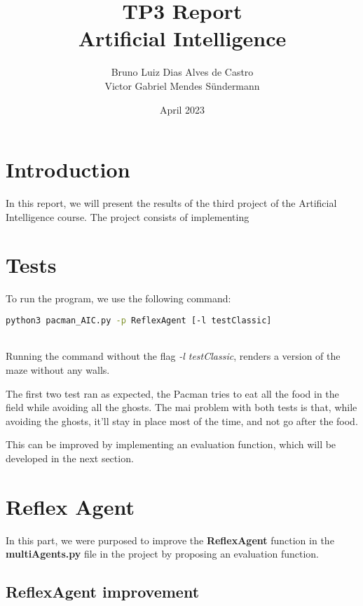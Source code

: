 \documentclass{article}
\title{\huge TP3 Report \\ Artificial Intelligence}
\author{Bruno Luiz Dias Alves de Castro \\ Victor Gabriel Mendes Sündermann}
\date{April 2023}
\begin{document}
\maketitle

\section{Introduction}

In this report, we will present the results of the third project of the Artificial Intelligence course. The project consists of implementing

\section{Tests}
To run the program, we use the following command:
~\\

\begin{lstlisting}[language=bash]
    python3 pacman_AIC.py -p ReflexAgent [-l testClassic]
\end{lstlisting}

~\\
Running the command without the flag \textit{-l testClassic}, renders a version of the maze without any walls.

The first two test ran as expected, the Pacman tries to eat all the food in the field while avoiding all the ghosts. The mai problem with both tests is that, while avoiding the ghosts, it'll stay in place most of the time, and not go after the food.

This can be improved by implementing an evaluation function, which will be developed in the next section.

\section{Reflex Agent}

In this part, we were purposed to improve the \textbf{ReflexAgent} function in the \textbf{multiAgents.py} file in the project by proposing an evaluation function.

\subsection{ReflexAgent improvement}
\end{document}
